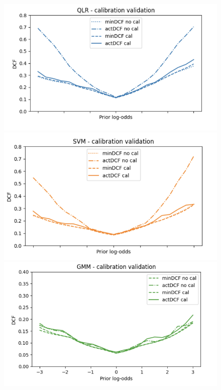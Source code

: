 \documentclass{article}
\begin{document}
\begin{figure}[H]
    \centering
    \begin{minipage}{.4\textwidth}
        \centering
        \includegraphics[width=\linewidth]{./img/Cal1.png}
    \end{minipage}%
    \begin{minipage}{.4\textwidth}
        \centering
        \includegraphics[width=\linewidth]{./img/Cal2.png}
    \end{minipage}
    \begin{minipage}{.4\textwidth}
        \centering
        \includegraphics[width=\linewidth]{./img/Cal3.png}

\end{minipage}
\end{figure}
\end{document}
